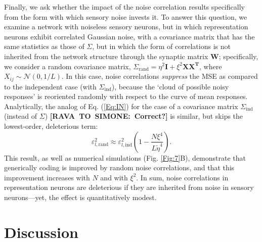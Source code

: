 \documentclass[a4paper]{article}%
\begin{document}
Finally, we ask whether the impact of the noise correlation results
specifically from the form with which sensory noise invests it. To answer this
question, we examine a network with noiseless sensory neurons, but in which
representation neurons exhibit correlated Gaussian noise, with a covariance
matrix that has the same statistics as those of $\Sigma$, but in which the
form of correlations is not inherited from the network structure through the
synaptic matrix $\mathbf{W}$; specifically, we consider a random covariance
matrix, $\Sigma_{\text{rand}}=\eta^{2}\mathbf{I}+\xi^{2}\mathbf{XX^{T}}$,
where $X_{ij}\sim\mathcal{N}(0,1/L)$. In this case, noise correlations
\textit{suppress} the MSE as compared to the independent case (with
$\Sigma_{\text{ind}}$), because the `cloud of possible noisy responses' is
reoriented randomly with respect to the curve of mean responses. Analytically,
the analog of Eq. (\ref{Eq:IN}) for the case of a covariance matrix
$\Sigma_{\text{ind}}$ (instead of $\Sigma$)
\textbf{[RAVA\ TO\ SIMONE:\ Correct?]} is similar, but skips the lowest-order,
deleterious term:
\begin{equation}
\varepsilon_{l,\text{rand}}^{2}\approx\varepsilon_{l,\text{ind}}^{2}\left(
1-\frac{N\xi^{4}}{L\tilde{\eta}^{4}}\right)  . \label{Eq:Rand}%
\end{equation}
This result, as well as numerical simulations (Fig. \ref{Fig:7}B), demonstrate
that generically coding is improved by random noise correlations, and that
this improvement increases with $N$ and with $\xi^{2}$. In sum, noise
correlations in representation neurons are deleterious if they are inherited
from noise in sensory neurons---yet, the effect is quantitatively modest.

\section{Discussion}
\end{document}
